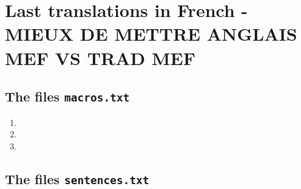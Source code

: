 \documentclass[twoside]{tutodoc}
\begin{document}
\makeatletter

\section*{Last translations in French - MIEUX DE METTRE ANGLAIS MEF VS TRAD MEF}

\subsection*{The files \texttt{macros.txt}}

\begin{enumerate}
    \item {}


    \item {}


    \item {}
\end{enumerate}



\subsection*{The files \texttt{sentences.txt}}
\end{document}
